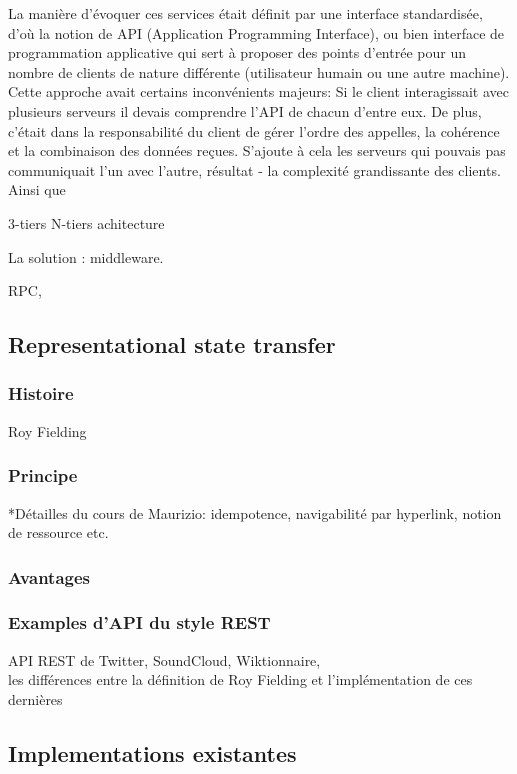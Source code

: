 La manière d'évoquer ces services était définit par une interface standardisée, d'où la notion de API (Application Programming Interface), ou bien interface de programmation applicative qui sert à proposer des points d'entrée pour un nombre de clients de nature différente (utilisateur humain ou une autre machine).
\\ 
Cette approche avait certains inconvénients majeurs:
Si le client interagissait avec plusieurs serveurs il devais comprendre l'API de chacun d'entre eux. De plus, c'était dans la responsabilité du client de gérer l'ordre des appelles, la cohérence et la combinaison des données reçues. S'ajoute à cela les serveurs qui pouvais pas communiquait l'un avec l'autre, résultat - la complexité grandissante des clients. 
\\


 Ainsi que 




3-tiers N-tiers achitecture


La solution : middleware.  

RPC, 
 

\subsection{Representational state transfer}
\subsubsection{Histoire}
Roy Fielding
\subsubsection{Principe}
*Détailles du cours de Maurizio: idempotence, navigabilité par hyperlink, 
notion de ressource etc.
\subsubsection{Avantages}
\subsubsection{Examples d'API du style REST}
API REST de Twitter, SoundCloud, Wiktionnaire,\\
les différences entre la définition de Roy Fielding et l'implémentation de ces dernières

\subsection{Implementations existantes}
